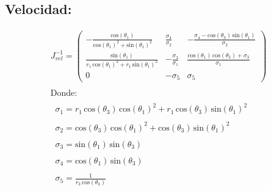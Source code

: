 \documentclass[12pt]{article}
\begin{document}
\subsection{Velocidad:}
\begin{equation*}
\begin{array}{l}
J^{-1}_{vel}=\left(\begin{array}{ccc}
-\frac{\mathrm{cos}\left(\theta_1 \right)}{{\mathrm{cos}\left(\theta_1 \right)}^2 +{\mathrm{sin}\left(\theta_1 \right)}^2 } & \frac{\sigma_4 }{\sigma_2 } & -\frac{\sigma_4 -\mathrm{cos}\left(\theta_3 \right)\,\mathrm{sin}\left(\theta_1 \right)}{\sigma_2 }\\
\frac{\mathrm{sin}\left(\theta_1 \right)}{r_1 \,{\mathrm{cos}\left(\theta_1 \right)}^2 +r_1 \,{\mathrm{sin}\left(\theta_1 \right)}^2 } & -\frac{\sigma_3 }{\sigma_1 } & \frac{\mathrm{cos}\left(\theta_1 \right)\,\mathrm{cos}\left(\theta_3 \right)+\sigma_3 }{\sigma_1 }\\
0 & -\sigma_5  & \sigma_5 
\end{array}\right)\\
\mathrm{}\\
\textrm{Donde:}\\
\mathrm{}\\
\;\;\sigma_1 =r_1 \,\mathrm{cos}\left(\theta_3 \right)\,{\mathrm{cos}\left(\theta_1 \right)}^2 +r_1 \,\mathrm{cos}\left(\theta_3 \right)\,{\mathrm{sin}\left(\theta_1 \right)}^2 \\
\mathrm{}\\
\;\;\sigma_2 =\mathrm{cos}\left(\theta_3 \right)\,{\mathrm{cos}\left(\theta_1 \right)}^2 +\mathrm{cos}\left(\theta_3 \right)\,{\mathrm{sin}\left(\theta_1 \right)}^2 \\
\mathrm{}\\
\;\;\sigma_3 =\mathrm{sin}\left(\theta_1 \right)\,\mathrm{sin}\left(\theta_3 \right)\\
\mathrm{}\\
\;\;\sigma_4 =\mathrm{cos}\left(\theta_1 \right)\,\mathrm{sin}\left(\theta_3 \right)\\
\mathrm{}\\
\;\;\sigma_5 =\frac{1}{r_3 \,\mathrm{cos}\left(\theta_3 \right)}
\end{array}
\label{jacobiano inv vel}    
\end{equation*}
\end{document}
